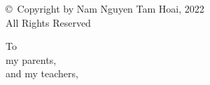 \begin{preliminary}

\null\vfill
\begin{center}
\begin{singlespace}
\copyright \ Copyright by Nam Nguyen Tam Hoai, 2022\\
All Rights Reserved
\end{singlespace}
\end{center}
\vfill\null
\newpage



\null\vfill
\begin{center}
	\begin{doublespace}
		To \\
		my parents,\\
		and my teachers,\\
	\end{doublespace}
\end{center}
\vfill\null
\newpage

\singlespacing
\setcounter{tocdepth}{1}

\renewcommand{\contentsname}{\centerline{TABLE OF CONTENTS}}

\tableofcontents\newpage
\let\clearpage\relax

\newpage

\renewcommand{\listfigurename}{\centerline{LIST OF FIGURES}}
\listoffigures
\newpage
\let\clearpage\relax

\newpage

\renewcommand{\listtablename}{\centerline{LIST OF TABLES}}
\listoftables
\newpage
\let\clearpage\relax

\newpage


\end{preliminary}

